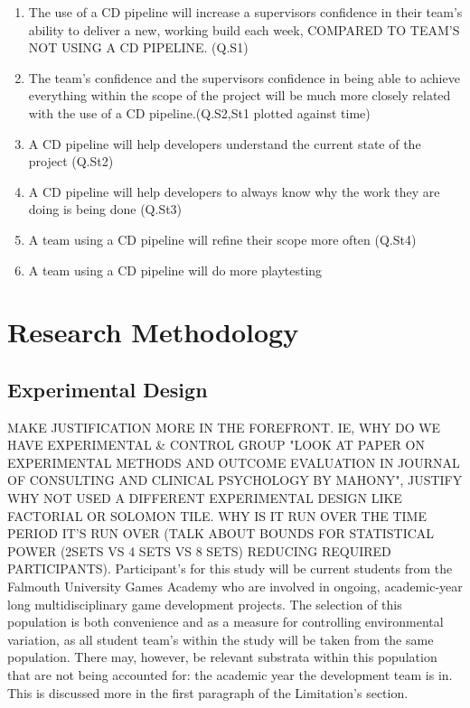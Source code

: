 \documentclass[journal]{IEEEtran}
\begin{document}
\begin{enumerate}
    \item \label{h_supconfidence} The use of a CD pipeline will increase a supervisors confidence in their team's ability to deliver a new, working build each week, COMPARED TO TEAM'S NOT USING A CD PIPELINE. (Q.S1)
    \item \label{h_supteamconfidence} The team's confidence and the supervisors confidence in being able to achieve everything within the scope of the project will be much more closely related with the use of a CD pipeline.(Q.S2,St1 plotted against time)
    \item \label{h_projectstate} A CD pipeline will help developers understand the current state of the project (Q.St2)
    \item \label{h_workreason} A CD pipeline will help developers to always know why the work they are doing is being done (Q.St3)
    \item \label{h_scoperefine} A team using a CD pipeline will refine their scope more often (Q.St4)
    \item \label{h_playtesting} A team using a CD pipeline will do more playtesting
\end{enumerate}

\section{Research Methodology}
\subsection{Experimental Design}
MAKE JUSTIFICATION MORE IN THE FOREFRONT. IE, WHY DO WE HAVE EXPERIMENTAL \& CONTROL GROUP "LOOK AT PAPER ON EXPERIMENTAL METHODS AND OUTCOME EVALUATION IN JOURNAL OF CONSULTING AND CLINICAL PSYCHOLOGY BY MAHONY", JUSTIFY WHY NOT USED A DIFFERENT EXPERIMENTAL DESIGN LIKE FACTORIAL OR SOLOMON TILE. WHY IS IT RUN OVER THE TIME PERIOD IT'S RUN OVER (TALK ABOUT BOUNDS FOR STATISTICAL POWER (2SETS VS 4 SETS VS 8 SETS) REDUCING REQUIRED PARTICIPANTS).
Participant's for this study will be current students from the Falmouth University Games Academy who are involved in ongoing, academic-year long multidisciplinary game development projects. The selection of this population is both convenience and as a measure for controlling environmental variation, as all student team's within the study will be taken from the same population. There may, however, be relevant substrata within this population that are not being accounted for: the academic year the development team is in. This is discussed more in the first paragraph of the Limitation's section.
\end{document}
